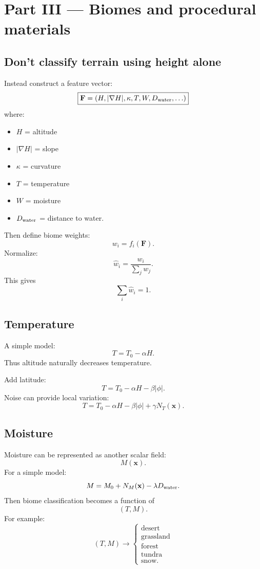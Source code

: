 \documentclass[12pt]{article}
\begin{document}
	\section*{Part III — Biomes and procedural materials}
	
	\subsection{Don't classify terrain using height alone}
	
	Instead construct a feature vector:
	\[
	\boxed{
		\mathbf F=
		(H,|\nabla H|,
		\kappa,
		T,
		W,
		D_{\rm water},
		\ldots)
	}
	\]
	where:
	\begin{itemize}
		\item $H$ = altitude
		\item $|\nabla H|$ = slope
		\item $\kappa$ = curvature
		\item $T$ = temperature
		\item $W$ = moisture
		\item $D_{\rm water}$ = distance to water.
	\end{itemize}
	
	Then define biome weights:
	\[
	\boxed{
		w_i=f_i(\mathbf F).
	}
	\]
	Normalize:
	\[
	\boxed{
		\hat w_i=
		\frac{w_i}{\sum_j w_j}.
	}
	\]
	This gives
	\[
	\sum_i \hat w_i=1.
	\]
	
	\subsection{Temperature}
	
	A simple model:
	\[
	T=T_0-\alpha H.
	\]
	Thus altitude naturally decreases temperature.
	
	Add latitude:
	\[
	T= T_0 -\alpha H -\beta|\phi|.
	\]
	Noise can provide local variation:
	\[
	T= T_0-\alpha H-\beta|\phi| +\gamma N_T(\mathbf x).
	\]
	
	\subsection{Moisture}
	
	Moisture can be represented as another scalar field:
	\[
	M(\mathbf x).
	\]
	For a simple model:
	\[
	M= M_0 + N_M(\mathbf x) - \lambda D_{\rm water}.
	\]
	Then biome classification becomes a function of
	\[
	(T,M).
	\]
	For example:
	\[
	(T,M) \rightarrow
	\begin{cases}
		\text{desert}\\
		\text{grassland}\\
		\text{forest}\\
		\text{tundra}\\
		\text{snow}.
	\end{cases}
	\]
	
\end{document}
